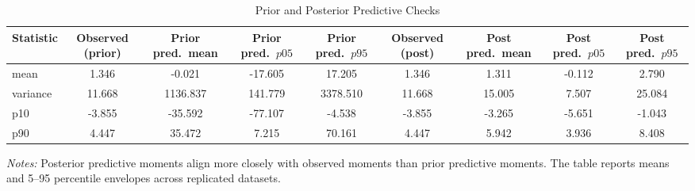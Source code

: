 \begin{table}[!htbp]
\centering
\begin{threeparttable}
 \caption{Prior and Posterior Predictive Checks}
 \label{tab:ppc_summary}
\begin{tabular}{lcccccccc}
\toprule
Statistic & Observed (prior) & Prior pred.\ mean & Prior pred.\ $p05$ & Prior pred.\ $p95$ & Observed (post) & Post pred.\ mean & Post pred.\ $p05$ & Post pred.\ $p95$ \\
\midrule
mean & 1.346 & -0.021 & -17.605 & 17.205 & 1.346 & 1.311 & -0.112 & 2.790 \\
variance & 11.668 & 1136.837 & 141.779 & 3378.510 & 11.668 & 15.005 & 7.507 & 25.084 \\
p10 & -3.855 & -35.592 & -77.107 & -4.538 & -3.855 & -3.265 & -5.651 & -1.043 \\
p90 & 4.447 & 35.472 & 7.215 & 70.161 & 4.447 & 5.942 & 3.936 & 8.408 \\
\bottomrule
\end{tabular}
\begin{tablenotes}[flushleft]
\footnotesize
\item \textit{Notes:} Posterior predictive moments align more closely with observed moments than prior predictive moments. The table reports means and 5--95 percentile envelopes across replicated datasets.
\end{tablenotes}
\end{threeparttable}
\end{table}

